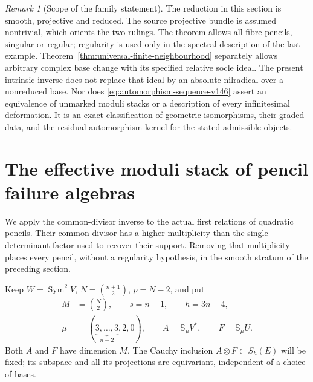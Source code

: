 \documentclass[11pt,reqno]{amsart}
\numberwithin{equation}{section}
\theoremstyle{definition}\newtheorem{definition}[theorem]{Definition}
\theoremstyle{remark}\newtheorem{remark}[theorem]{Remark}
\DeclareMathOperator{\Sym}{Sym}\DeclareMathOperator{\Gr}{Gr}
\begin{document}
\begin{remark}[Scope of the family statement]
\label{rem:moving-scope-v146}
The reduction in this section is smooth, projective and reduced.  The
source projective bundle is assumed nontrivial, which orients the two
rulings.  The theorem allows all fibre pencils, singular or regular;
regularity is used only in the spectral description of the last
example.  Theorem~\ref{thm:universal-finite-neighbourhood} separately
allows arbitrary complex base change with its specified relative
socle ideal.  The present intrinsic inverse does not replace that
ideal by an absolute nilradical over a nonreduced base.  Nor does
\eqref{eq:automorphism-sequence-v146} assert an equivalence of
unmarked moduli stacks or a description of every infinitesimal
deformation.  It is an exact classification of geometric
isomorphisms, their graded data, and the residual automorphism kernel
for the stated admissible objects.
\end{remark}


\section{The effective moduli stack of pencil failure algebras}
\label{sec:pencil-deformations}

We apply the common-divisor inverse to the actual first relations of
quadratic pencils.  Their common divisor has a higher multiplicity
than the single determinant factor used to recover their support.
Removing that multiplicity places every pencil, without a regularity
hypothesis, in the smooth stratum of the preceding section.

Keep \(W=\Sym^2V\), \(N=\binom{n+1}{2}\), \(p=N-2\), and put
\begin{equation}\label{eq:primitive-pencils}
 \begin{split}
 M&=\binom N2,\qquad s=n-1,\qquad h=3n-4,\\
 \mu&=(\underbrace{3,\ldots,3}_{n-2},2,0),\qquad
 A=\mathbb S_\mu V^*,\qquad F=\mathbb S_\mu U.
 \end{split}
\end{equation}
Both \(A\) and \(F\) have dimension \(M\).  The Cauchy inclusion
\(A\otimes F\subset S_h(E)\) will be fixed; its subspace and all
its projections are equivariant, independent of a choice of bases.
\end{document}
